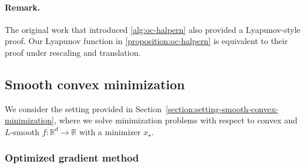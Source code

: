 \documentclass{article}
\theoremstyle{definition}
\theoremstyle{plain}
\newcommand{\reals}{\mathbb{R}}
\begin{document}
\paragraph{Remark.} The original work \citep{ParkRyu2022_exact} that introduced \eqref{alg:oc-halpern} also provided a Lyapunov-style proof.
Our Lyapunov function in \cref{proposition:oc-halpern} is equivalent to their proof under rescaling and translation.

\subsection{Smooth convex minimization}

We consider the setting provided in Section~\ref{section:setting-smooth-convex-minimization}, where we solve minimization problems 
with respect to convex and $L$-smooth $f\colon \reals^d \to \reals$ with a minimizer $x_\star$. 

\subsubsection{Optimized gradient method}
\label{section:ogm}
\end{document}
